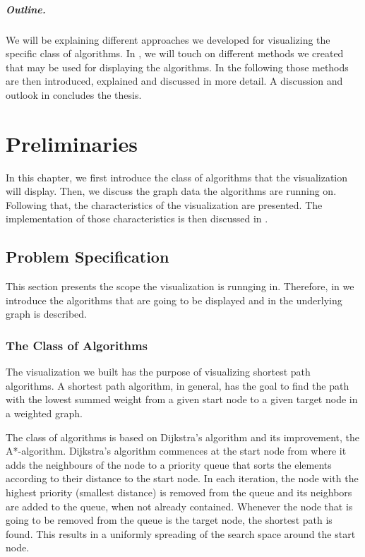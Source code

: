 \documentclass
[
    paper = a4,
    pagesize,
    12 pt,
    oneside,                       %
    open = right,
    DIV = calc,
    BCOR = 0 mm,                   %
    bibtotoc
]
{scrbook}
\begin{document}
\paragraph{Outline.} We will be explaining different approaches we developed for visualizing the specific class of algorithms.
In , we will touch on different methods we created that may be used for displaying the algorithms.
In the following  those methods are then introduced, explained and discussed in more detail.
A discussion and outlook in  concludes the thesis.


\chapter{Preliminaries} \label{questions}

In this chapter, we first introduce the class of algorithms that the visualization will display.
Then, we discuss the graph data the algorithms are running on.
Following that, the characteristics of the visualization are presented.
The implementation of those characteristics is then discussed in .


\section{Problem Specification} \label{specification}

This section presents the scope the visualization is runnging in.
Therefore, in  we introduce the algorithms that are going to be displayed and in  the underlying graph is described.

\subsection{The Class of Algorithms} \label{framework}

The visualization we built has the purpose of visualizing shortest path algorithms.
A shortest path algorithm, in general, has the goal to find the path with the lowest summed weight from a given start node to a given target node in a weighted graph.

The class of algorithms is based on Dijkstra's algorithm\cite{DIJKSTRA1959} and its improvement, the A*-algorithm\cite{4082128}.
Dijkstra's algorithm commences at the start node from where it adds the neighbours of the node to a priority queue that sorts the elements according to their distance to the start node.
In each iteration, the node with the highest priority (smallest distance) is removed from the queue and its neighbors are added to the queue, when not already contained.
Whenever the node that is going to be removed from the queue is the target node, the shortest path is found.
This results in a uniformly spreading of the search space around the start node.
\end{document}
